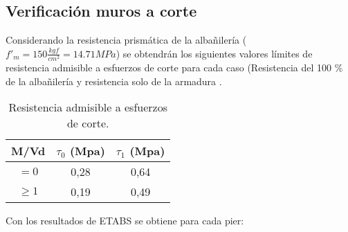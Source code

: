 \subsection{Verificación muros a corte}

Considerando la resistencia prismática de la albañilería ($f'_m=150\frac{kgf}{cm^2}=14.71MPa$) se obtendrán los siguientes valores límites de resistencia admisible a esfuerzos de corte para cada caso (Resistencia del 100 \% de la albañilería y resistencia solo de la armadura .

\begin{table}[H]
  \centering
  \caption{Resistencia admisible a esfuerzos de corte.}
  \begin{tabular}{ccc}
    \hline
    \textbf{M/Vd} & \boldmath{}\textbf{$\tau_0 $ (Mpa)}\unboldmath{} & \boldmath{}\textbf{$\tau_1 $ (Mpa)}\unboldmath{} \bigstrut\\
    \hline
    $=0$  & 0,28  & 0,64 \bigstrut[t]\\
    $\geq 1$ & 0,19  & 0,49 \bigstrut[b]\\
    \hline
  \end{tabular}
  \label{resadm}
\end{table}

Con los resultados de ETABS se obtiene para cada pier:

